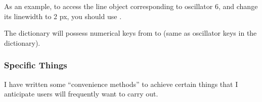 \documentclass[letterpaper,10pt,english]{sphinxmanual}
\begin{document}
\sphinxAtStartPar
As an example, to access the line object corresponding to oscillator 6, and
change its line\sphinxhyphen{}width to 2 px, you should use
.

\sphinxAtStartPar
The  dictionary will possess numerical keys from  to 
(same as oscillator keys in the  dictionary).


\subsubsection{Specific Things}
\label{\detokenize{misc/figure_customisation:specific-things}}
\sphinxAtStartPar
I have written some “convenience methods” to achieve certain things that
I anticipate users will frequently want to carry out.
\end{document}
